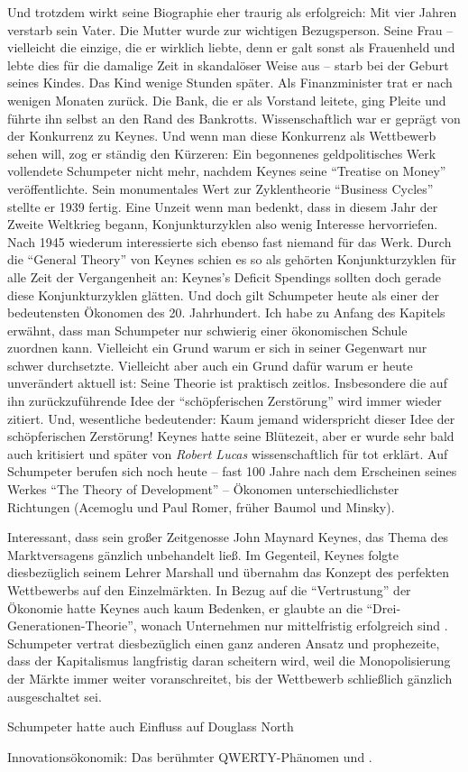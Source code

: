 Und trotzdem wirkt seine Biographie eher traurig als erfolgreich: Mit vier Jahren verstarb sein Vater. Die Mutter wurde zur wichtigen Bezugsperson. Seine Frau -- vielleicht die einzige, die er wirklich liebte, denn er galt sonst als Frauenheld und lebte dies für die damalige Zeit in skandalöser Weise aus -- starb bei der Geburt seines Kindes. Das Kind wenige Stunden später. 
Als Finanzminister trat er nach wenigen Monaten zurück. Die Bank, die er als Vorstand leitete, ging Pleite und führte ihn selbst an den Rand des Bankrotts. Wissenschaftlich war er geprägt von der Konkurrenz zu Keynes. Und wenn man diese Konkurrenz als Wettbewerb sehen will, zog er ständig den Kürzeren: Ein begonnenes geldpolitisches Werk vollendete Schumpeter nicht mehr, nachdem Keynes seine "`Treatise on Money"' veröffentlichte. Sein monumentales Wert zur Zyklentheorie "`Business Cycles"' stellte er 1939 fertig. Eine Unzeit wenn man bedenkt, dass in diesem Jahr der Zweite Weltkrieg begann, Konjunkturzyklen also wenig Interesse hervorriefen. Nach 1945 wiederum interessierte sich ebenso fast niemand für das Werk. Durch die "`General Theory"' von Keynes schien es so als gehörten Konjunkturzyklen für alle Zeit der Vergangenheit an: Keynes's Deficit Spendings sollten doch gerade diese Konjunkturzyklen glätten.
Und doch gilt Schumpeter heute als einer der bedeutensten Ökonomen des 20. Jahrhundert. Ich habe zu Anfang des Kapitels erwähnt, dass man Schumpeter nur schwierig einer ökonomischen Schule zuordnen kann. Vielleicht ein Grund warum er sich in seiner Gegenwart nur schwer durchsetzte. Vielleicht aber auch ein Grund dafür warum er heute unverändert aktuell ist: Seine Theorie ist praktisch zeitlos. Insbesondere die auf ihn zurückzuführende Idee der "`schöpferischen Zerstörung"' wird immer wieder zitiert. Und, wesentliche bedeutender: Kaum jemand widerspricht dieser Idee der schöpferischen Zerstörung! Keynes hatte seine Blütezeit, aber er wurde sehr bald auch kritisiert und später von \textit{Robert Lucas} wissenschaftlich für tot erklärt. Auf Schumpeter berufen sich noch heute -- fast 100 Jahre nach dem Erscheinen seines Werkes "`The Theory of Development"' -- Ökonomen unterschiedlichster Richtungen (Acemoglu und Paul Romer, früher Baumol und Minsky).

Interessant, dass sein großer Zeitgenosse John Maynard Keynes, das Thema des Marktversagens gänzlich unbehandelt ließ. Im Gegenteil, Keynes folgte diesbezüglich seinem Lehrer Marshall und übernahm das Konzept des perfekten Wettbewerbs auf den Einzelmärkten. In Bezug auf die "`Vertrustung"' der Ökonomie hatte Keynes auch kaum Bedenken, er glaubte an die "`Drei-Generationen-Theorie"', wonach Unternehmen nur mittelfristig erfolgreich sind \parencite[S. 93]{Snowdon2005}. Schumpeter vertrat diesbezüglich einen ganz anderen Ansatz und prophezeite, dass der Kapitalismus langfristig daran scheitern wird, weil die Monopolisierung der Märkte immer weiter voranschreitet, bis der Wettbewerb schließlich gänzlich ausgeschaltet sei.

Schumpeter hatte auch Einfluss auf Douglass North \textcite[S. 11]{Menard2014}


Innovationsökonomik: Das berühmter QWERTY-Phänomen \parencite{David1985} und \parencite{Arthur1989}.








